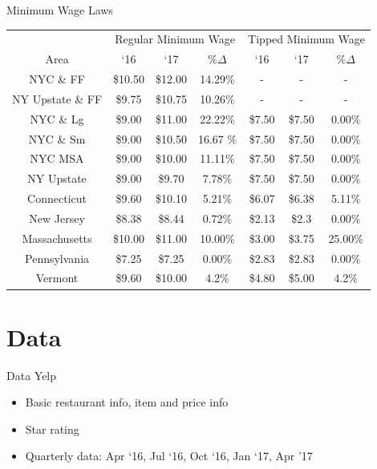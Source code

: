 \documentclass[xcolor=table]{beamer}
\begin{document}
\begin{spacing}{1.2}
\begin{frame}[label=main]{Minimum Wage Laws}
\footnotesize
\centering
\begin{tabular}{ c c c c c c c} \\ \hline \hline
&  \multicolumn{3}{c}{Regular Minimum Wage} & \multicolumn{3}{c}{Tipped Minimum Wage}\\
 Area & `16  & `17  & $\% \Delta$ & `16 & `17 &  $\% \Delta$  \\ \hline \hline
 NYC \& FF & \$10.50 & \$12.00 & 14.29\%& - & - & - \\
 NY Upstate \& FF  & \$9.75 & \$10.75 & 10.26\% & - & -& - \\
\rowcolor{yellow} NYC \& Lg & \$9.00 & \$11.00 & 22.22\% & \$7.50 & \$7.50 & 0.00\%\\
\rowcolor{yellow} NYC \& Sm & \$9.00 & \$10.50 & 16.67 \% & \$7.50 & \$7.50 & 0.00\%\\
\rowcolor{yellow} NYC MSA & \$9.00 & \$10.00 & 11.11\% & \$7.50 & \$7.50 & 0.00\%\\
\rowcolor{yellow} NY Upstate & \$9.00 & \$9.70 & 7.78\% & \$7.50 & \$7.50  & 0.00\% \\
Connecticut & \$9.60 & \$10.10 & 5.21\% & \$6.07 & \$6.38 & 5.11\% \\
\rowcolor{yellow} New Jersey &  \$8.38 & \$8.44 & 0.72\%  & \$2.13 & \$2.3 & 0.00\% \\
\rowcolor{yellow}  Massachusetts & \$10.00 & \$11.00 & 10.00\% & \$3.00 & \$3.75  & 25.00\% \\
Pennsylvania &  \$7.25 & \$7.25 & 0.00\% & \$2.83 & \$2.83 & 0.00\% \\
Vermont &  \$9.60 & \$10.00 & 4.2\% & \$4.80 & \$5.00 & 4.2\% \\
\end{tabular}
\raggedleft
\hyperlink{supplemental}{}
\end{frame}


%
%

\section{Data}

\begin{frame}{Data}
Yelp 
\begin{itemize}
\item Basic restaurant info, item and price info
\item Star rating 
\item Quarterly data: Apr `16, Jul `16, Oct `16, Jan `17, Apr '17
\end{itemize}


\end{frame}
\end{spacing}
\end{document}
